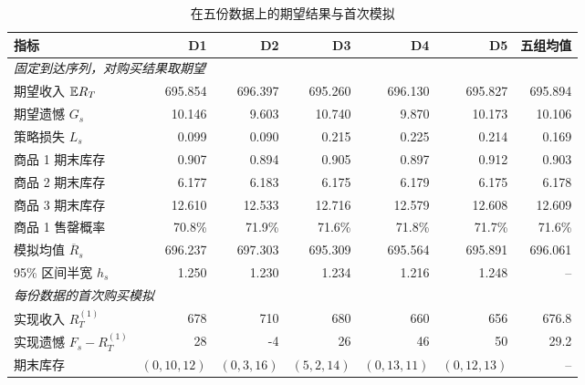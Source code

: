 \begin{table}[htbp]
\centering\small
\caption{\LPDual{} 在五份数据上的期望结果与首次模拟}\label{tab:main}
\begin{tabular}{lrrrrrr}
\toprule
指标 & D1 & D2 & D3 & D4 & D5 & 五组均值 \\
\midrule
\multicolumn{7}{l}{\textit{固定到达序列，对购买结果取期望}} \\
期望收入 $\mathbb E R_T$ & 695.854 & 696.397 & 695.260 & 696.130 & 695.827 & 695.894 \\
期望遗憾 $G_s$ & 10.146 & 9.603 & 10.740 & 9.870 & 10.173 & 10.106 \\
策略损失 $L_s$ & 0.099 & 0.090 & 0.215 & 0.225 & 0.214 & 0.169 \\
商品 1 期末库存 & 0.907 & 0.894 & 0.905 & 0.897 & 0.912 & 0.903 \\
商品 2 期末库存 & 6.177 & 6.183 & 6.175 & 6.179 & 6.175 & 6.178 \\
商品 3 期末库存 & 12.610 & 12.533 & 12.716 & 12.579 & 12.608 & 12.609 \\
商品 1 售罄概率 & 70.8\% & 71.9\% & 71.6\% & 71.8\% & 71.7\% & 71.6\% \\
\midrule
模拟均值 $\overline R_s$ & 696.237 & 697.303 & 695.309 & 695.564 & 695.891 & 696.061 \\
95\% 区间半宽 $h_s$ & 1.250 & 1.230 & 1.234 & 1.216 & 1.248 & -- \\
\midrule
\multicolumn{7}{l}{\textit{每份数据的首次购买模拟}} \\
实现收入 $R_T^{(1)}$ & 678 & 710 & 680 & 660 & 656 & 676.8 \\
实现遗憾 $F_s-R_T^{(1)}$ & 28 & -4 & 26 & 46 & 50 & 29.2 \\
期末库存 & $(0,10,12)$ & $(0,3,16)$ & $(5,2,14)$ & $(0,13,11)$ & $(0,12,13)$ & -- \\
\bottomrule
\end{tabular}
\par{}
\end{table}
